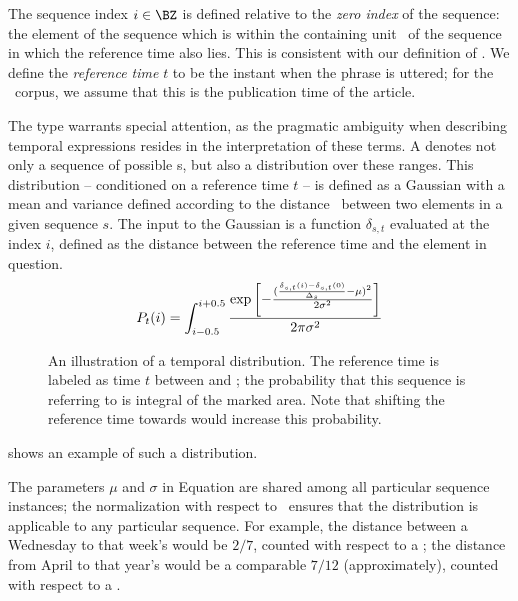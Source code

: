 The sequence index $i \in \BZ$ is defined relative to the 
	\textit{zero index} of the sequence:
	the element of the sequence
	which is within the containing unit \seqcanon\ of the sequence in which the 
	reference time also lies.
This is consistent with our definition of \seqelem.
We define the \textit{reference time} $t$ \cite{key:1947reichenback-temporal}
	to be the instant when the phrase 
	is uttered; for the \tempeval\ corpus, we assume that this is the 
	publication time of the article.

The  type warrants special attention, as the pragmatic ambiguity 
	when describing temporal expressions resides in the interpretation of these
	terms.
A  denotes not only a sequence of possible
	s, but also a distribution over these ranges.
This distribution -- conditioned on a reference time $t$ --
	is defined as a Gaussian with a mean and variance defined according
	to the distance \seqjump\ between two elements in a given sequence $s$.
The input to the Gaussian is a function $\delta_{s,t}$ evaluated
	at the index $i$, defined as the distance between the reference time 
	and the element in question.
\begin{equation}
\label{eqn:gaussian}
	P_t(i) = 
	\int_{i-0.5}^{i+0.5}
		\frac{
			\exp\left[-\frac{
					(\frac{\delta_{s,t}(i)-\delta_{s,t}(0)}{\Delta_s} - \mu)^2
				}{
					2\sigma^2
				}
			\right]
		}{
			2\pi\sigma^2
		}
\end{equation}
\begin{figure}[t]
\begin{center}
	\resizebox{1.1\hsize}{!}{
		
	}
	\caption{
		\label{fig:distribution}
		An illustration of a temporal distribution.
		The reference time is labeled as time $t$ between  and 
			; the probability that this sequence is referring to
			 is integral of the marked area.
		Note that shifting the reference time towards  would increase
			this probability.
	}
\end{center}
\end{figure}
 shows an example of such a distribution.

The parameters $\mu$ and $\sigma$ in Equation  are shared
	among all particular sequence instances; the normalization
	with respect to \seqjump\ ensures that the distribution is applicable
	to any particular sequence.
For example, the distance between a Wednesday to that week's 
	would be $2/7$, counted with respect to a ; 
	the distance from April to that year's  would be a 
	comparable $7/12$ (approximately), counted with respect to a .
	
